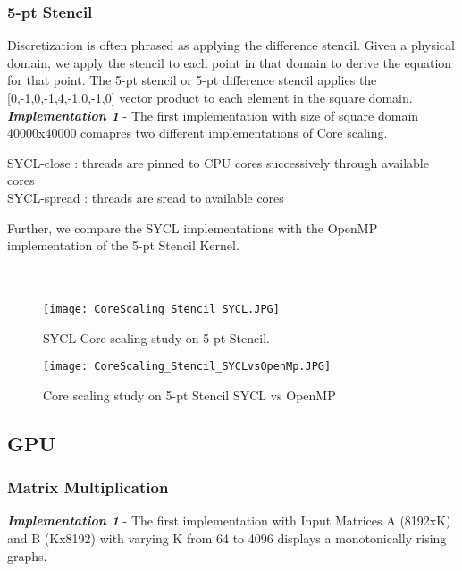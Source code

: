 \documentclass[14pt,fleqn]{article}
\begin{document}
\subsubsection{5-pt Stencil}
Discretization is often phrased as applying the difference stencil. Given a physical domain, we apply the stencil to each point in that domain to derive the equation for that point. The 5-pt stencil or 5-pt difference stencil applies the [0,-1,0,-1,4,-1,0,-1,0] vector product to each element in the square domain.
\\
\textit{\textbf{Implementation 1}} - The first implementation with size of square domain 40000x40000 comapres two different implementations of Core scaling.

SYCL-close : threads are pinned to CPU cores successively through available cores \\
SYCL-spread : threads are sread to available cores

Further, we compare the SYCL implementations with the OpenMP implementation of the 5-pt Stencil Kernel.
\\\\\\
\begin{figure}
\centering
\texttt{[image: CoreScaling\_Stencil\_SYCL.JPG]}
\caption{SYCL Core scaling study on 5-pt Stencil.}
\end{figure} 

\begin{figure}
\centering
\texttt{[image: CoreScaling\_Stencil\_SYCLvsOpenMp.JPG]}
\caption{Core scaling study on 5-pt Stencil SYCL vs OpenMP}
\end{figure} 

\subsection{GPU}
\subsubsection{Matrix Multiplication}
\textit{\textbf{Implementation 1}} - The first implementation with Input Matrices A (8192xK) and B (Kx8192) with varying K from 64 to 4096 displays a monotonically rising graphs.\\
\end{document}
